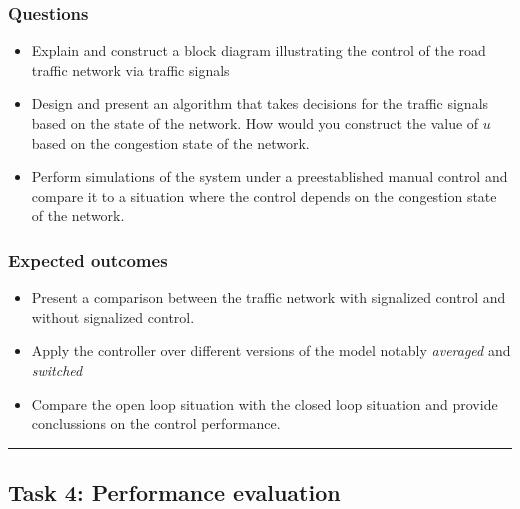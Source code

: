 \documentclass[]{book}
\theoremstyle{definition}
\theoremstyle{definition}
\theoremstyle{definition}
\theoremstyle{remark}
\begin{document}
\hypertarget{questions-2}{%
\subsubsection*{Questions}\label{questions-2}}

\begin{itemize}
\item
  Explain and construct a block diagram illustrating the control of the
  road traffic network via traffic signals
\item
  Design and present an algorithm that takes decisions for the traffic
  signals based on the state of the network. How would you construct the
  value of \(u\) based on the congestion state of the network.
\item
  Perform simulations of the system under a preestablished manual
  control and compare it to a situation where the control depends on the
  congestion state of the network.
\end{itemize}

\hypertarget{expected-outcomes-2}{%
\subsubsection*{Expected outcomes}\label{expected-outcomes-2}}

\begin{itemize}
\item
  Present a comparison between the traffic network with signalized
  control and without signalized control.
\item
  Apply the controller over different versions of the model notably
  \emph{averaged} and \emph{switched}
\item
  Compare the open loop situation with the closed loop situation and
  provide conclussions on the control performance.
\end{itemize}

\begin{center}\rule{0.5\linewidth}{\linethickness}\end{center}

\hypertarget{task-4-performance-evaluation}{%
\subsection*{Task 4: Performance
evaluation}\label{task-4-performance-evaluation}}
\end{document}
